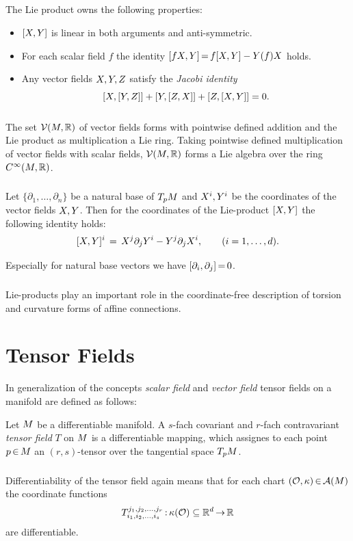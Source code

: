 \documentclass[11pt,twoside]{article}
\begin{document}
\subparagraph{}
The Lie product owns the following properties:
\begin{itemize}[leftmargin=15pt]
\item[1.]
$[X,Y]$ is linear in both arguments and anti-symmetric.
\item[2.]
For each scalar field $f$ the identity 
$[fX,Y] {\,=\,} f [X,Y] - Y(f) X$ holds.
\item[3.]
Any vector fields $X,Y,Z$ satisfy the \textit{Jacobi identity}
\[
[X,[Y,Z]] + [Y,[Z,X]] + [Z,[X,Y]] = 0.
\]
\end{itemize}

\subparagraph{}
The set ${\mathcal{V}}({M},{\mathbb{R}})$ of vector fields
forms with pointwise defined addition
and the Lie product as multiplication a Lie ring.
Taking pointwise defined multiplication of vector fields
with scalar fields,
${\mathcal{V}}({M},{\mathbb{R}})$ forms a Lie algebra over the ring $C^{\infty}({M},{\mathbb{R}})$.

\subparagraph{}
Let $\{\partial_1,\ldots,\partial_n\}$ be a natural base of $T_p {M}$
and $X^i, Y^i$ be the coordinates of the vector fields $X,Y$.
Then for the coordinates of the Lie-product $[X,Y]$
the following identity holds:
\[
[X,Y]^i \,=\,
X^j \partial_j Y^i - Y^j \partial_j X^i, \qquad (i=1,\ldots,d).
\]

Especially for natural base vectors we have $[\partial_i,\partial_j] {\,=\,} 0$.

\subparagraph{}
Lie-products play an important role in the coordinate-free description
of torsion and curvature forms of affine connections.

\section{Tensor Fields}
In generalization of the concepts \textit{scalar field}
and \textit{vector field} tensor fields on a manifold are defined as follows:

\begin{definition}
Let ${M}$ be a differentiable manifold.
A $s$-fach covariant and $r$-fach contravariant \textit{tensor field} $T$
on ${M}$ is a differentiable mapping,
which assignes to each point $p {\,\in\,} {M}$ an $(r,s)$-tensor
over the tangential space $T_p {M}$.
\end{definition}

\subparagraph{}
Differentiability of the tensor field again means
that for each chart $(\mathcal{O},\kappa) {\,\in\,} {\mathcal{A}}({M})$
the coordinate functions
\[
T_{i_1,i_2,\ldots,i_s}^{j_1,j_2,\ldots,j_r} {\,:\,}
\kappa(\mathcal{O}) \subseteq {\mathbb{R}}^d {\,\to\,} {\mathbb{R}}
\]
are differentiable.
\end{document}
